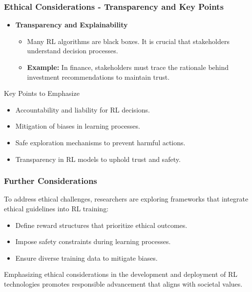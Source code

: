 \documentclass[aspectratio=169]{beamer}
\begin{document}
\begin{frame}[fragile]
    \frametitle{Ethical Considerations - Transparency and Key Points}
    \begin{itemize}
        \item \textbf{Transparency and Explainability}
            \begin{itemize}
                \item Many RL algorithms are black boxes. It is crucial that stakeholders understand decision processes.
                \item \textbf{Example:} 
                In finance, stakeholders must trace the rationale behind investment recommendations to maintain trust.
            \end{itemize}
    \end{itemize}

    \begin{block}{Key Points to Emphasize}
        \begin{itemize}
            \item Accountability and liability for RL decisions.
            \item Mitigation of biases in learning processes.
            \item Safe exploration mechanisms to prevent harmful actions.
            \item Transparency in RL models to uphold trust and safety.
        \end{itemize}
    \end{block}
\end{frame}

\begin{frame}[fragile]
    \frametitle{Further Considerations}
    To address ethical challenges, researchers are exploring frameworks that integrate ethical guidelines into RL training:
    \begin{itemize}
        \item Define reward structures that prioritize ethical outcomes.
        \item Impose safety constraints during learning processes.
        \item Ensure diverse training data to mitigate biases.
    \end{itemize}

    Emphasizing ethical considerations in the development and deployment of RL technologies promotes responsible advancement that aligns with societal values.
\end{frame}
\end{document}
